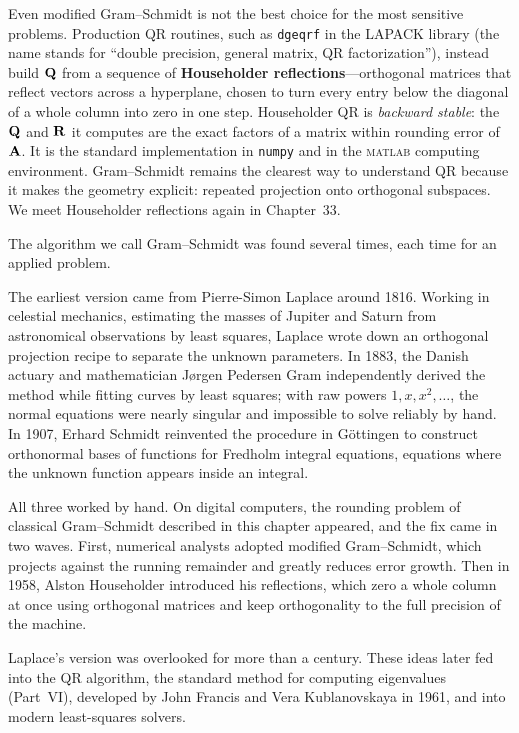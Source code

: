 \begin{remark}
Even modified Gram--Schmidt is not the best choice for the most sensitive
problems. Production QR routines, such as \texttt{dgeqrf} in the LAPACK library
(the name stands for ``double precision, general matrix, QR factorization''), instead build
$\mathbf{Q}$ from a sequence of \textbf{Householder reflections}---orthogonal matrices that reflect
vectors across a hyperplane, chosen to turn every entry below the diagonal of a whole
column into zero in one step.
Householder QR is \emph{backward stable}: the $\mathbf{Q}$ and $\mathbf{R}$ it computes are the exact
factors of a matrix within rounding error of $\mathbf{A}$. It is the standard implementation in
\texttt{numpy} and in the \textsc{matlab} computing environment. Gram--Schmidt remains the
clearest way to understand QR because it makes the geometry explicit: repeated projection onto
orthogonal subspaces. We meet Householder reflections again in Chapter~33.
\end{remark}

\begin{historybox}
The algorithm we call Gram--Schmidt was found several times, each time for an applied
problem.

The earliest version came from Pierre-Simon Laplace around 1816. Working in celestial
mechanics, estimating the masses of Jupiter and Saturn from astronomical observations by
least squares, Laplace wrote down an orthogonal projection recipe to separate the unknown
parameters. In 1883, the Danish actuary and
mathematician J\o rgen Pedersen Gram independently derived the method while fitting curves
by least squares; with
raw powers $1, x, x^2, \dots$, the normal equations were nearly singular and impossible
to solve reliably by hand. In 1907, Erhard Schmidt reinvented
the procedure in G\"ottingen to construct orthonormal bases of functions for Fredholm
integral equations, equations where the unknown function appears inside an integral.

All three worked by hand. On digital computers, the rounding problem of classical
Gram--Schmidt described in this chapter appeared, and the fix came in two waves. First,
numerical analysts adopted modified Gram--Schmidt, which projects against the running
remainder and greatly reduces error growth. Then in 1958, Alston Householder introduced his
reflections, which zero a whole column at once using orthogonal matrices and keep
orthogonality to the full precision of the machine.

Laplace's version was overlooked for more than a century. These ideas later fed into the
QR algorithm, the standard method for computing eigenvalues (Part~VI), developed by John
Francis and Vera Kublanovskaya in 1961, and into modern least-squares solvers.
\end{historybox}

